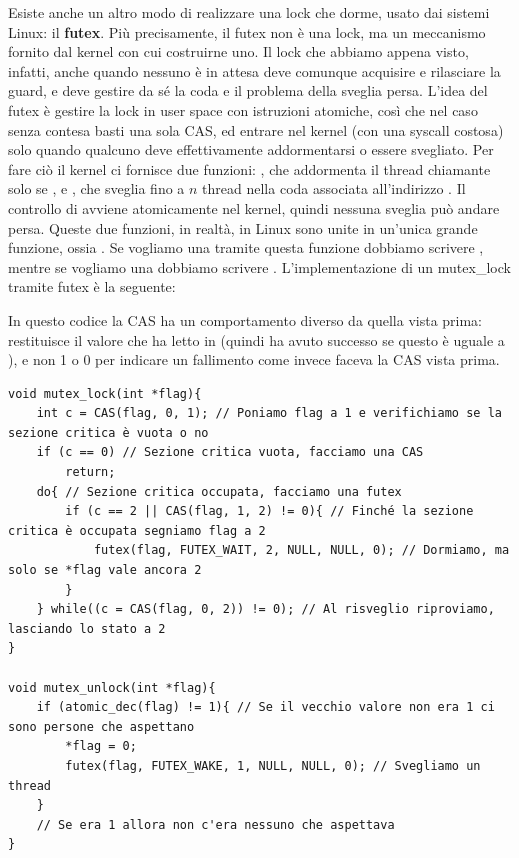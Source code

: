 \documentclass[11pt, a4paper, titlepage, oneside]{scrbook}
\begin{document}
Esiste anche un altro modo di realizzare una lock che dorme, usato dai sistemi Linux: il \textbf{futex}. Più precisamente, il futex non è una lock, ma un meccanismo fornito dal kernel con cui costruirne uno. Il lock che abbiamo appena visto, infatti, anche quando nessuno è in attesa deve comunque acquisire e rilasciare la guard, e deve gestire da sé la coda e il problema della sveglia persa. L'idea del futex è gestire la lock in user space con istruzioni atomiche, così che nel caso senza contesa basti una sola CAS, ed entrare nel kernel (con una syscall costosa) solo quando qualcuno deve effettivamente addormentarsi o essere svegliato. Per fare ciò il kernel ci fornisce due funzioni: , che addormenta il thread chiamante solo se , e , che sveglia fino a $n$ thread nella coda associata all'indirizzo . Il controllo di  avviene atomicamente nel kernel, quindi nessuna sveglia può andare persa. Queste due funzioni, in realtà, in Linux sono unite in un'unica grande funzione, ossia . Se vogliamo una  tramite questa funzione dobbiamo scrivere , mentre se vogliamo una  dobbiamo scrivere . L'implementazione di un mutex\_lock tramite futex è la seguente:

\NB In questo codice la CAS ha un comportamento diverso da quella vista prima:  restituisce il valore che ha letto in  (quindi ha avuto successo se questo è uguale a ), e non 1 o 0 per indicare un fallimento come invece faceva la CAS vista prima.

\begin{lstlisting}[style=C]
void mutex_lock(int *flag){
    int c = CAS(flag, 0, 1); // Poniamo flag a 1 e verifichiamo se la sezione critica è vuota o no
    if (c == 0) // Sezione critica vuota, facciamo una CAS
        return;
    do{ // Sezione critica occupata, facciamo una futex
        if (c == 2 || CAS(flag, 1, 2) != 0){ // Finché la sezione critica è occupata segniamo flag a 2
            futex(flag, FUTEX_WAIT, 2, NULL, NULL, 0); // Dormiamo, ma solo se *flag vale ancora 2
        }
    } while((c = CAS(flag, 0, 2)) != 0); // Al risveglio riproviamo, lasciando lo stato a 2
}

void mutex_unlock(int *flag){
    if (atomic_dec(flag) != 1){ // Se il vecchio valore non era 1 ci sono persone che aspettano
        *flag = 0;
        futex(flag, FUTEX_WAKE, 1, NULL, NULL, 0); // Svegliamo un thread
    }
    // Se era 1 allora non c'era nessuno che aspettava
}
\end{lstlisting}
\end{document}
